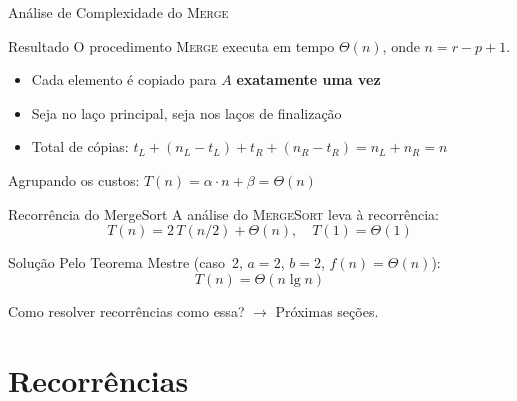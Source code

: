 \documentclass[aspectratio=169]{beamer}
\newcommand{\impt}[1]{\textcolor{maccent}{\textbf{#1}}}
\newcommand{\ntc}[1]{\textcolor{mprimary}{#1}}
\begin{document}

\begin{frame}{Análise de Complexidade do \textsc{Merge}}
\begin{block}{Resultado}
O procedimento \textsc{Merge} executa em tempo \impt{$\Theta(n)$}, onde $n = r - p + 1$.
\end{block}

\vspace{0.3cm}
\pause

\begin{itemize}
    \item Cada elemento é copiado para $A$ \impt{exatamente uma vez}
    \item Seja no laço principal, seja nos laços de finalização
    \item Total de cópias: $t_L + (n_L - t_L) + t_R + (n_R - t_R) = n_L + n_R = n$
\end{itemize}

\vspace{0.3cm}
\pause

Agrupando os custos: $T(n) = \alpha \cdot n + \beta = \Theta(n)$
\end{frame}


\begin{frame}{Recorrência do MergeSort}
A análise do \textsc{MergeSort} leva à recorrência:
\[
T(n) = 2\,T(n/2) + \Theta(n), \quad T(1) = \Theta(1)
\]

\pause
\vspace{0.3cm}

\begin{alertblock}{Solução}
Pelo Teorema Mestre (caso~2, $a=2$, $b=2$, $f(n)=\Theta(n)$):
\[
T(n) = \Theta(n \lg n)
\]
\end{alertblock}

\vspace{0.2cm}

\ntc{Como resolver recorrências como essa?} $\longrightarrow$ Próximas seções.
\end{frame}

\section{Recorrências}
\end{document}
